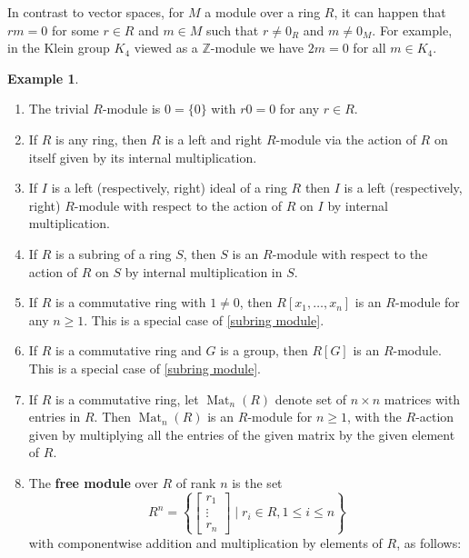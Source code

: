 \documentclass[12pt]{report}
\numberwithin{equation}{section}
\numberwithin{theorem}{chapter}
\theoremstyle{definition}
\newtheorem{example}[theorem]{Example}
\newtheorem*{basic properties}{Basic Properties}
\newtheorem*{Important Remark}{Important Remark}
\newcommand{\df}[1]{{\bf #1}\index{#1}}
\DeclareMathOperator{\M}{Mat}
\begin{document}
In contrast to vector spaces, for $M$ a module over a ring $R$, it can happen that $rm=0$ for some $r \in R$ and $m \in M$ such that $r \neq 0_R$ and $m \neq 0_M$. For example, in the Klein group $K_4$ viewed as a $\mathbb{Z}$-module we have $2m=0$ for all $m \in K_4$.


\begin{example}
\begin{enumerate}[label=(\arabic*)]
\item The trivial $R$-module is $0=\{0\}$ with $r0=0$ for any $r\in R$.
\item If $R$ is any ring, then $R$ is a left and right $R$-module via the action of $R$ on itself given by its internal multiplication.
\item If $I$ is a left (respectively, right) ideal of a ring $R$ then $I$ is a left (respectively, right) $R$-module with respect to the action of $R$ on $I$ by internal multiplication. 
\item\label{subring module} If $R$ is a subring of a ring $S$, then $S$ is an $R$-module with respect to the action of $R$ on $S$ by internal multiplication in $S$.
\item If $R$ is a commutative ring with $1 \neq 0$, then $R[x_1,\ldots,x_n]$ is an $R$-module for any $n \geqslant 1$. This is a special case of \ref{subring module}.
\item If $R$ is a commutative ring and $G$ is a group, then $R[G]$ is an $R$-module. This is a special case of \ref{subring module}.
\item If $R$ is a commutative ring, let $\M_n(R)$ denote set of $n \times n$ matrices with entries in $R$. Then $\M_n(R)$ is an $R$-module for $n\geqslant 1$, with the $R$-action given by multiplying all the entries of the given matrix by the given element of $R$.
\item The \df{free module} over $R$ of rank $n$ is the set
$$R^n=\left\{\begin{bmatrix} r_1\\ \vdots\\r_n \end{bmatrix} \mid r_i\in R, 1 \leqslant i \leqslant n\right\}$$
with componentwise addition and multiplication by elements of $R$, as follows:

\end{enumerate}
\end{example}
\end{document}
